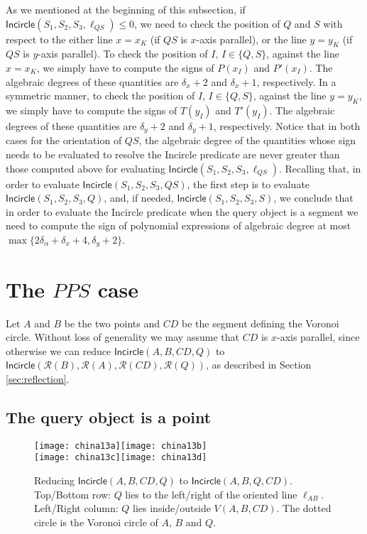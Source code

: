 \documentclass[letterpaper,11pt]{article}
\newcommand{\incircle}{\textsf{Incircle}\xspace}
\newcommand{\vor}{Voronoi\xspace}
\newcommand{\rfx}[1]{\mathcal{R}(#1)\xspace}
\newcommand{\pps}{$PPS$\xspace}
\begin{document}
As we mentioned at the beginning of this subsection, if
$\incircle(S_1,S_2,S_3,\ell_{QS})\le{}0$, we need to check the
position of $Q$ and $S$ with respect to the either line $x=x_K$ (if
$QS$ is $x$-axis parallel), or the line $y=y_K$ (if $QS$ is $y$-axis
parallel). To check the position of $I$, $I\in\{Q,S\}$, against the
line $x=x_K$, we simply have to compute the signs of $P(x_I)$ and
$P'(x_I)$. The algebraic degrees of these quantities are $\delta_x+2$
and $\delta_x+1$, respectively. In a symmetric manner, to check the
position of $I$, $I\in\{Q,S\}$, against the line $y=y_K$, we
simply have to compute the signs of $T(y_I)$ and $T'(y_I)$. The
algebraic degrees of these quantities are $\delta_y+2$ and
$\delta_y+1$, respectively. Notice that in both cases for the
orientation of $QS$, the algebraic degree of the quantities whose sign
needs to be evaluated to resolve the \incircle predicate are never
greater than those computed above for evaluating
$\incircle(S_1,S_2,S_3,\ell_{QS})$.
Recalling that, in order to evaluate $\incircle(S_1,S_2,S_3,QS)$, the
first step is to evaluate $\incircle(S_1,S_2,S_3,Q)$, and, if needed,
$\incircle(S_1,S_2,S_3,S)$, we conclude that in order to evaluate the
\incircle predicate when the query object is a segment we need to
compute the sign of polynomial expressions of algebraic degree
at most $\max\{2\delta_\alpha+\delta_x+4,\delta_y+2\}$.



\section{The \pps case}\label{sec:pps}

Let $A$ and $B$ be the two points and $CD$ be the segment defining the
\vor circle. Without loss of generality we may assume that $CD$ is
$x$-axis parallel, since otherwise we can reduce $\incircle(A,B,CD,Q)$
to $\incircle(\rfx{B},\rfx{A},\rfx{CD},\rfx{Q})$, as described in
Section \ref{sec:reflection}.

\subsection{The query object is a point}\label{sec:ppsp}

\begin{figure}[!b]
  \begin{center}
    \texttt{[image: china13a]}\hfil \texttt{[image: china13b]}\\[3pt]\texttt{[image: china13c]}\hfil \texttt{[image: china13d]}
  \end{center}
  \caption{Reducing $\incircle(A,B,CD,Q)$ to
    $\incircle(A,B,Q,CD)$. Top/Bottom row: $Q$ lies to the
    left/right of the oriented line $\ell_{AB}$.
    Left/Right column: $Q$ lies inside/outside $V(A,B,CD)$. The dotted
    circle is the \vor circle of $A$, $B$ and $Q$.}
  \label{fig:ppsp-reduction}
\end{figure}
\end{document}
